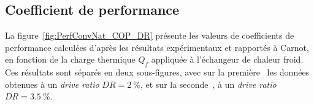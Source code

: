 \subsection{Coefficient de performance}

La figure~\ref{fig:PerfConvNat_COP_DR} présente les valeurs de coefficients de performance calculées d'après les résultats expérimentaux et rapportés à Carnot, en fonction de la charge thermique $\dot Q_f$ appliquée à l'échangeur de chaleur froid. Ces résultats sont séparés en deux sous-figures, avec sur la première~ les données obtenues à un \textit{drive ratio} $DR=\qty{2}{\percent}$, et sur la seconde~, à un \textit{drive ratio} $DR=\qty{3.5}{\percent}$.\medskip

